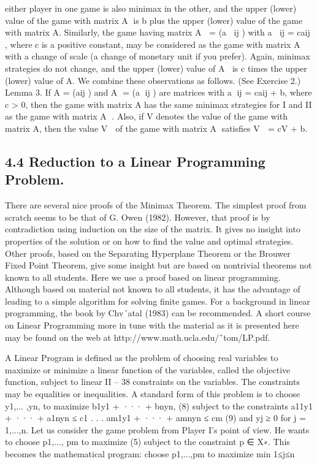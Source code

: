 \documentclass[]{report}
\begin{document}
either player in one game is also minimax in the other, and the upper (lower) value of the
game with matrix A is b plus the upper (lower) value of the game with matrix A.
Similarly, the game having matrix A = (a
ij ) with a
ij = caij , where c is a positive
constant, may be considered as the game with matrix A with a change of scale (a change
of monetary unit if you prefer). Again, minimax strategies do not change, and the upper
(lower) value of A is c times the upper (lower) value of A. We combine these observations
as follows. (See Exercise 2.)
Lemma 3. If A = (aij ) and A = (a
ij ) are matrices with a
ij = caij + b, where c > 0,
then the game with matrix A has the same minimax strategies for I and II as the game
with matrix A
. Also, if V denotes the value of the game with matrix A, then the value
V  of the game with matrix A satisfies V  = cV + b.

\subsection{4.4 Reduction to a Linear Programming Problem.} There are several nice proofs
of the Minimax Theorem. The simplest proof from scratch seems to be that of G. Owen
(1982). However, that proof is by contradiction using induction on the size of the matrix.
It gives no insight into properties of the solution or on how to find the value and optimal
strategies. Other proofs, based on the Separating Hyperplane Theorem or the Brouwer
Fixed Point Theorem, give some insight but are based on nontrivial theorems not known
to all students.
Here we use a proof based on linear programming. Although based on material not
known to all students, it has the advantage of leading to a simple algorithm for solving
finite games. For a background in linear programming, the book by Chv´atal (1983) can be
recommended. A short course on Linear Programming more in tune with the material as
it is presented here may be found on the web at http://www.math.ucla.edu/˜tom/LP.pdf.

A Linear Program is defined as the problem of choosing real variables to maximize or
minimize a linear function of the variables, called the objective function, subject to linear
II – 38
constraints on the variables. The constraints may be equalities or inequalities. A standard
form of this problem is to choose y1,... ,yn, to
maximize b1y1 + ··· + bnyn, (8)
subject to the constraints
a11y1 + ··· + a1nyn ≤ c1
.
.
.
am1y1 + ··· + amnyn ≤ cm
(9)
and
yj ≥ 0 for j = 1,...,n.
Let us consider the game problem from Player I’s point of view. He wants to choose
p1,..., pm to maximize (5) subject to the constraint p ∈ X∗. This becomes the mathematical
program: choose p1,...,pm to
maximize min
1≤j≤n
\end{document}
